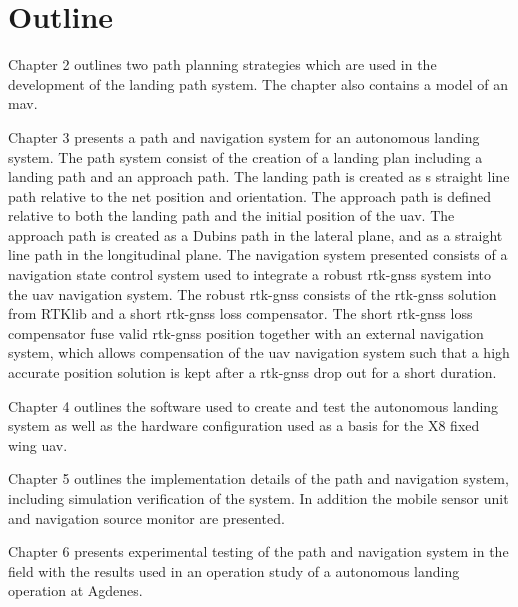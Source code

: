 \section{Outline}
Chapter 2 outlines two path planning strategies which are used in the development of the landing path system. The chapter also contains a model of an \gls{mav}.

Chapter 3 presents a path and navigation system for an autonomous landing system. The path system consist of the creation of a landing plan including a landing path and an approach path. The landing path is created as s straight line path relative to the net position and orientation. The approach path is defined relative to both the landing path and the initial position of the \gls{uav}. The approach path is created as a Dubins path in the lateral plane, and as a straight line path in the longitudinal plane. The navigation system presented consists of a navigation state control system used to integrate a robust \gls{rtk-gnss} system into the \gls{uav} navigation system. The robust \gls{rtk-gnss} consists of the \gls{rtk-gnss} solution from RTKlib and a short \gls{rtk-gnss} loss compensator. The short \gls{rtk-gnss} loss compensator fuse valid \gls{rtk-gnss} position together with an external navigation system, which allows compensation of the \gls{uav} navigation system such that a high accurate position solution is kept after a \gls{rtk-gnss} drop out for a short duration.


Chapter 4 outlines the software used to create and test the autonomous landing system as well as the hardware configuration used as a basis for the X8 fixed wing \gls{uav}.

Chapter 5 outlines the implementation details of the path and navigation system, including simulation verification of the system. In addition the mobile sensor unit and navigation source monitor are presented.

Chapter 6 presents experimental testing of the path and navigation system in the field with the results used in an operation study of a autonomous landing operation at Agdenes.


